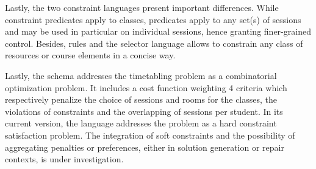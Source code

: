 Lastly, the two constraint languages present important differences.
While {\ITC} constraint predicates apply to classes,
{\UTP} predicates apply to any set(s) of sessions
and may be used in particular on individual sessions, hence granting finer-grained control.
Besides, {\UTP} rules and the selector language allows to constrain any class of resources or course elements in a concise way.

Lastly, the {\ITC} schema addresses the timetabling problem as a combinatorial optimization problem.
It includes a cost function weighting 4 criteria which respectively penalize the choice of sessions and rooms for the classes, the violations of constraints and the overlapping of sessions per student.
In its current version, the {\UTP} language addresses the problem as a hard constraint satisfaction problem.
The integration of soft constraints and the possibility of aggregating penalties or preferences, either in solution generation or repair contexts, is under investigation.



%
